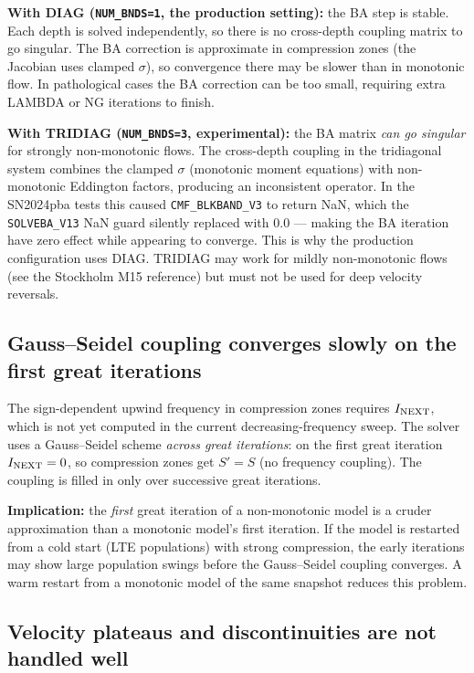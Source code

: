 \documentclass[11pt]{article}
\begin{document}
\textbf{With DIAG (\texttt{NUM\_BNDS=1}, the production setting):} the
BA step is stable.  Each depth is solved independently, so there is no
cross-depth coupling matrix to go singular.  The BA correction is
approximate in compression zones (the Jacobian uses clamped $\sigma$),
so convergence there may be slower than in monotonic flow.  In
pathological cases the BA correction can be too small, requiring extra
LAMBDA or NG iterations to finish.

\textbf{With TRIDIAG (\texttt{NUM\_BNDS=3}, experimental):} the BA
matrix \emph{can go singular} for strongly non-monotonic flows.  The
cross-depth coupling in the tridiagonal system combines the clamped
$\sigma$ (monotonic moment equations) with non-monotonic Eddington
factors, producing an inconsistent operator.  In the SN2024pba tests
this caused \texttt{CMF\_BLKBAND\_V3} to return NaN, which the
\texttt{SOLVEBA\_V13} NaN guard silently replaced with 0.0 --- making
the BA iteration have zero effect while appearing to converge.  This is
why the production configuration uses DIAG.  TRIDIAG may work for mildly
non-monotonic flows (see the Stockholm M15 reference) but must not be
used for deep velocity reversals.

\subsection{Gauss--Seidel coupling converges slowly on the first great iterations}

The sign-dependent upwind frequency in compression zones requires
$I_{\rm NEXT}$, which is not yet computed in the current
decreasing-frequency sweep.  The solver uses a Gauss--Seidel scheme
\emph{across great iterations}: on the first great iteration
$I_{\rm NEXT} = 0$, so compression zones get $S' = S$ (no frequency
coupling).  The coupling is filled in only over successive great
iterations.

\textbf{Implication:} the \emph{first} great iteration of a
non-monotonic model is a cruder approximation than a monotonic model's
first iteration.  If the model is restarted from a cold start (LTE
populations) with strong compression, the early iterations may show
large population swings before the Gauss--Seidel coupling converges.
A warm restart from a monotonic model of the same snapshot reduces this
problem.

\subsection{Velocity plateaus and discontinuities are not handled well}
\end{document}
